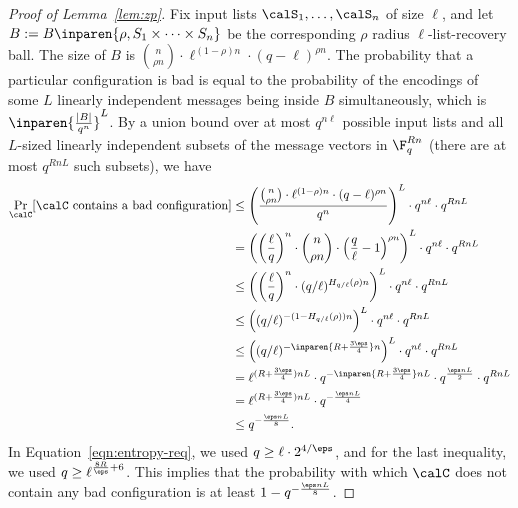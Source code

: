 \documentclass{article}
\begin{document}
\begin{proof}[Proof of Lemma~\ref{lem:zp}]
    Fix input lists $\calS_1, \ldots, \calS_n$ of size $\ell$, and let $B := B\inparen{ \rho, S_1 \times  \cdots \times S_n}$ be the corresponding $\rho$ radius $\ell$-list-recovery ball. The size of $B$ is $\binom{n}{\rho n}\cdot \ell^{(1-\rho)n}\cdot (q-\ell)^{\rho n}$.
    The probability that a particular configuration is bad is equal to the probability of the encodings of some $L$ linearly independent messages being inside $B$ simultaneously, which is $\inparen{\frac{|B|}{q^n}}^L$.
    By a union bound over at most $q^{n\ell}$ possible input lists and all $L$-sized linearly independent subsets of the message vectors in $\F_q^{Rn}$ (there are at most $q^{RnL}$ such subsets), we have
    \begin{align}
        \Pr_\calC[\calC \text{ contains a bad configuration}]
        &\le \left(\frac{\binom{n}{\rho n}\cdot \ell^{(1-\rho )n}\cdot (q-\ell)^{\rho n}}{q^n}\right)^L \cdot q^{n\ell}\cdot q^{RnL} \nonumber\\
        &= \left(\left(\frac{\ell}{q}\right)^{n}\cdot \binom{n}{\rho n}\cdot \left(\frac{q}{\ell}-1\right)^{\rho n}\right)^L \cdot q^{n\ell} \cdot q^{RnL}\nonumber\\
        &\le \left(\left(\frac{\ell}{q}\right)^{n}\cdot (q/\ell)^{H_{q/\ell}(\rho )n}\right)^L \cdot q^{n\ell}\cdot q^{RnL} \nonumber\\       
        &\le \left((q/\ell)^{-(1-H_{q/\ell}(\rho ))n}\right)^L \cdot q^{n\ell}\cdot q^{RnL} \nonumber\\       
        &\le \left((q/\ell)^{-\inparen{R+\frac{3\eps}{4}}n}\right)^L \cdot q^{n\ell}\cdot q^{RnL} \label{eqn:entropy-req}\\ 
        &= \ell^{(R+\frac{3\eps}{4})nL}\cdot q^{-\inparen{R+\frac{3\eps}{4}}nL}\cdot q^{\frac{\eps nL}{2}}\cdot q^{RnL}\nonumber\\
        &= \ell^{(R+\frac{3\eps}{4})nL}\cdot q^{-\frac{\eps nL}{4}} \nonumber\\
        &\leq q^{-\frac{\eps nL}{8}}. \nonumber
    \end{align}
    In Equation~\ref{eqn:entropy-req}, we used $q \geq \ell \cdot 2^{4/\eps}$, and for the last inequality, we used $q \geq \ell^{\frac{8R}{\eps}+6}$. This implies that the probability with which $\calC$ does not contain any bad configuration is at least $1-q^{-\frac{\eps nL}{8}}$.
\end{proof}
\end{document}
